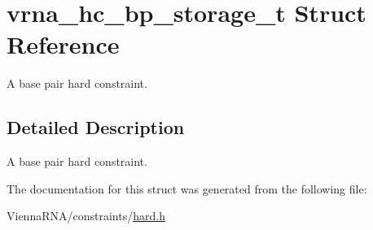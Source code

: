 \hypertarget{structvrna__hc__bp__storage__t}{}\section{vrna\+\_\+hc\+\_\+bp\+\_\+storage\+\_\+t Struct Reference}
\label{structvrna__hc__bp__storage__t}


A base pair hard constraint.  




\subsection{Detailed Description}
A base pair hard constraint. 

The documentation for this struct was generated from the following file\+:\begin{DoxyCompactItemize}
\item 
Vienna\+R\+N\+A/constraints/\hyperlink{hard_8h}{hard.\+h}\end{DoxyCompactItemize}

